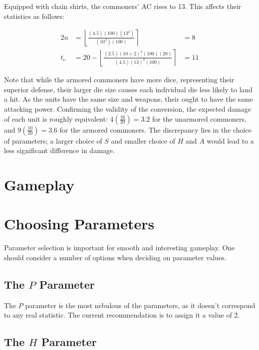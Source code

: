 \documentclass[twocolumn]{article}
\begin{document}
Equipped with chain shirts, the commoners' AC rises to 13.
This affects their statistics as follows:

\begin{alignat*}{2}
    n   &=  
        \left\lfloor
            \frac
                {(4.5) (100) (13^2)}
                {(10^2) (100)}
        \right\rceil
            &= 8
    \\
    t_c &=
        20 - 
        \left\lfloor
            \frac
                {(2.5) (10 + 2)^2 (100) (20)}
                {(4.5) (13)^2 (100)}
        \right\rceil
            &= 11
\end{alignat*}

Note that while the armored commoners have more dice,
representing their superior defense,
their larger die size causes each individual die less likely to land a hit.
As the units have the same size and weapons,
their ought to have the same attacking power.
Confirming the validity of the conversion,
the expected damage of each unit is roughly equivalent:
$4(\frac{16}{20}) = 3.2$ for the unarmored commoners,
and $9(\frac{10}{20}) = 3.6$ for the armored commoners.
The discrepancy lies in the choice of parameters;
a larger choice of $S$ and smaller choice of $H$ and $A$
would lead to a less significant difference in damage.

\section{Gameplay}\label{sec:game}

\section{Choosing Parameters}\label{sec:params}

Parameter selection is important for smooth and interesting gameplay.
One should consider a number of options when deciding on parameter values.

\subsection{The $P$ Parameter}

The $P$ parameter is the most nebulous of the parameters,
as it doesn't correspond to any real statistic.
The current recommendation is to assign it a value of 2.

\subsection{The $H$ Parameter}
\end{document}
